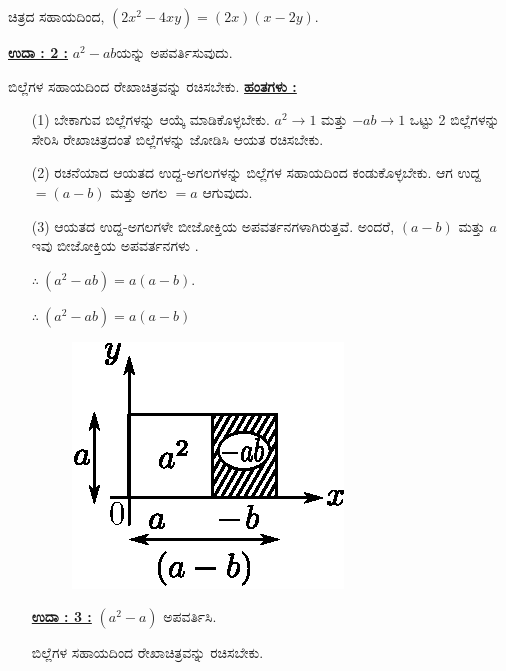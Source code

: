 ಚಿತ್ರದ ಸಹಾಯದಿಂದ, $(2x^2 - 4xy) = (2x)(x-2y).$

\noindent
{\textbf{\underline{ಉದಾ : 2 :}}} $a^2 - ab$ಯನ್ನು ಅಪವರ್ತಿಸುವುದು. 

ಬಿಲ್ಲೆಗಳ ಸಹಾಯದಿಂದ ರೇಖಾಚಿತ್ರವನ್ನು ರಚಿಸಬೇಕು.
\noindent
{\textbf{\underline{ಹಂತಗಳು :}}}
\begin{itemize}
\item [(1)] ಬೇಕಾಗುವ ಬಿಲ್ಲೆಗಳನ್ನು ಆಯ್ಕೆ ಮಾಡಿಕೊಳ್ಳಬೇಕು. $a^2 \rightarrow 1$ ಮತ್ತು $-ab \rightarrow 1$ ಒಟ್ಟು 2 ಬಿಲ್ಲೆಗಳನ್ನು ಸೇರಿಸಿ ರೇಖಾಚಿತ್ರದಂತೆ ಬಿಲ್ಲೆಗಳನ್ನು ಜೋಡಿಸಿ ಆಯತ ರಚಿಸಬೇಕು. 
\item [(2)] ರಚನೆಯಾದ ಆಯತದ ಉದ್ದ-ಅಗಲಗಳನ್ನು ಬಿಲ್ಲೆಗಳ ಸಹಾಯದಿಂದ ಕಂಡುಕೊಳ್ಳಬೇಕು. ಆಗ ಉದ್ದ $= (a-b)$ ಮತ್ತು ಅಗಲ $= a$ ಆಗುವುದು. 
\item [(3)] ಆಯತದ ಉದ್ದ-ಅಗಲಗಳೇ ಬೀಜೋಕ್ತಿಯ ಅಪವರ್ತನಗಳಾಗಿರುತ್ತವೆ. ಅಂದರೆ, $(a-b)$ ಮತ್ತು $a$ ಇವು ಬೀಜೋಕ್ತಿಯ ಅಪವರ್ತನಗಳು .

$\therefore~ (a^2 - ab) = a(a-b)$.


$\therefore \ (a^2 - ab) = a(a - b)$
\begin{figure}[H]
\centering
\includegraphics[scale=0.8]{src/figure/chap3/fig3-35b.eps}
\end{figure}

\noindent
{\textbf{\underline{ಉದಾ : 3 :}}} $(a^2 - a)$ ಅಪವರ್ತಿಸಿ. 

ಬಿಲ್ಲೆಗಳ ಸಹಾಯದಿಂದ ರೇಖಾಚಿತ್ರವನ್ನು ರಚಿಸಬೇಕು.
\end{itemize}

